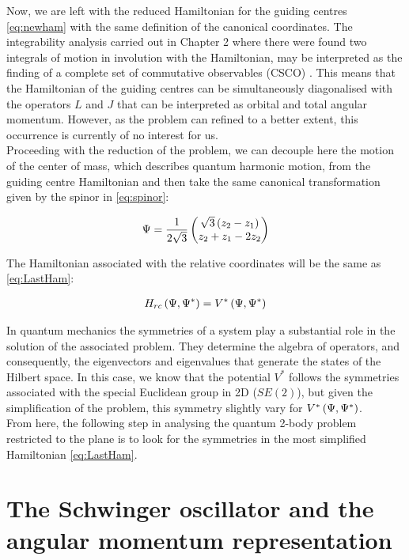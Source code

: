 
Now, we are left with the reduced Hamiltonian for the guiding centres \eqref{eq:newham} with the same definition of the canonical coordinates. The integrability analysis carried out in Chapter 2 where there were found two integrals of motion in involution with the Hamiltonian, may be interpreted as the finding of a complete set of commutative observables (CSCO) \cite{csco}. This means that the Hamiltonian of the guiding centres can be simultaneously diagonalised with the operators $L$ and $J$ that can be interpreted as orbital and total angular momentum. However, as the problem can refined to a better extent, this occurrence is currently of no interest for us.\\

Proceeding with the reduction of the problem, we can decouple here the motion of the center of mass, which describes quantum harmonic motion, from the guiding centre  Hamiltonian and then take the same canonical transformation given by the spinor in \eqref{eq:spinor}:

\begin{align}
\Psi = \frac{1}{2\sqrt{3}}\begin{pmatrix}\sqrt{3}\left( z_{2}-z_{1} \right)\\
z_{2}+z_{1}-2z_{2}\end{pmatrix}
\label{eq:spinor2}
\end{align}

The Hamiltonian associated with the relative coordinates will be the same as \eqref{eq:LastHam}:

\begin{align}
H_{rc}\left( \Psi,\Psi^* \right) = V^*\left( \Psi,\Psi^* \right)
\end{align}

In quantum mechanics the symmetries of a system play a substantial role in the solution of the associated problem. They determine the algebra of operators, and consequently, the eigenvectors and eigenvalues that generate the states of the Hilbert space. In this case, we know that the potential $V^*$ follows the symmetries associated with the special Euclidean group in 2D ($SE(2)$), but given the simplification of the problem, this symmetry slightly vary for $V^*\left( \Psi,\Psi^* \right)$.\\

From here, the following step in analysing the quantum 2-body problem restricted to the plane is to look for the symmetries in the most simplified Hamiltonian \eqref{eq:LastHam}.\\


\section{The Schwinger oscillator and the angular momentum representation}
